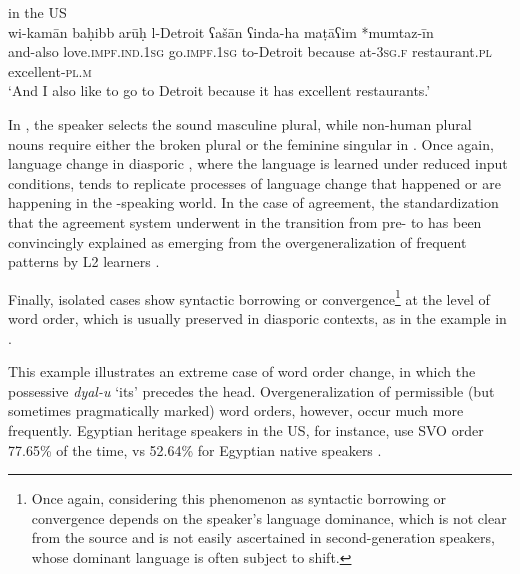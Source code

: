 \documentclass[output=paper]{langsci/langscibook}
\begin{document}
\ea\label{usa}
{ in the US \citep[740]{Albirini2014}}\\
\gll wi-kamān baḥibb arūḥ l-Detroit ʕašān ʕinda-ha maṭāʕim *mumtaz-īn\\
     and-also love.\textsc{impf.ind.1sg} go.\textsc{impf.1sg} to-Detroit because at-\textsc{3sg.f} restaurant.\textsc{pl} excellent-\textsc{pl.m}\\
\glt `And I also like to go to Detroit because it has excellent restaurants.'
\z

In , the speaker selects the sound masculine plural, while non-human plural nouns require either the {broken plural} or the feminine singular in . Once again, {language change} in diasporic , where the language is learned under reduced input conditions, tends to replicate processes of {language change} that happened or are happening in the -speaking world. In the case of {agreement}, the standardization that the {agreement} system underwent in the transition from pre- to   has been convincingly explained as emerging from the overgeneralization of frequent patterns by L2 learners \citep{Belnap1999}.

Finally, isolated cases show syntactic borrowing or {convergence}\footnote{Once again, considering this phenomenon as syntactic borrowing or {convergence} depends on the speaker’s language dominance, which is not clear from the source and is not easily ascertained in second-generation speakers, whose dominant language is often subject to shift.} at the level of {word order}, which is usually preserved in diasporic contexts, as in the example in .


This example illustrates an extreme case of {word order} change, in which the possessive \textit{dyal-u} ‘its’ precedes the head. Overgeneralization of permissible (but sometimes pragmatically marked) word orders, however, occur much more frequently. Egyptian {heritage speakers} in the US, for instance, use SVO order 77.65\% of the time, vs 52.64\% for Egyptian native speakers \citep[280–281]{AlbiriniSaadah2011}.
\end{document}
